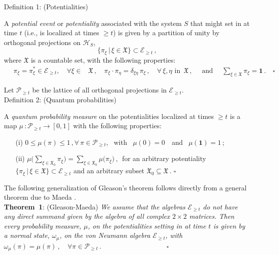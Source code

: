 \documentclass[12pt]{article}
\begin{document}
{Definition 1}: (Potentialities)

A \textit{potential event} or \textit{potentiality} associated with the system $S$ that might set in at time $t$ (i.e., is localized
at times $\geq t$) is given by a partition of unity by orthogonal projections on $\mathcal{H}_S$,
$$\big\{ \pi_{\xi}\, \vert \,\xi \in \mathfrak{X} \big\} \subset \mathcal{E}_{\geq t}\,,$$
where $\mathfrak{X}$ is a countable set, with the following properties:
\begin{align}\label{potentialty}
\quad \pi_{\xi}= \pi_{\xi}^{*} \in \mathcal{E}_{\geq t}, \quad \forall \xi \in &\mathfrak{X}\,,\quad
\pi_{\xi}\cdot\pi_{\eta} = \delta_{\xi \eta}\, \pi_{\xi} \,, \quad \forall\, \xi, \eta \text{ in }\, \mathfrak{X}\,, \quad
\text{ and } \quad \sum_{\xi \in \mathfrak{X}} \pi_{\xi} = \mathbf{1}\,.\quad \square
\end{align}

Let $\mathcal{P}_{\geq t}$ be the lattice of all orthogonal projections in $\mathcal{E}_{\geq t}$. \\

{Definition 2}: (Quantum probabilities)

A \textit{quantum probability measure} on the potentialities localized at times  $\geq t$ is a map
$\mu\,: \mathcal{P}_{\geq t} \rightarrow [0, 1]$ with the following properties:
\begin{enumerate}
\item[(i)]{ $0 \leq \mu(\pi) \leq 1\,, \forall\, \pi \in \mathcal{P}_{\geq t},$ \,\,with \,\,\,$\mu(0)=0\,$ \, and \, $\mu(\mathbf{1})=1\,$;}
\item[(ii)]{ $\mu\big(\sum_{\xi \in \mathfrak{X}_0} \pi_{\xi}\big) =
\sum_{\xi \in \mathfrak{X}_0} \mu\big(\pi_{\xi}\big)\,,$
\,for an arbitrary potentiality $\big\{ \pi_{\xi}\, \vert\, \xi \in \mathfrak{X} \big\} \subset \mathcal{E}_{\geq t}$ and
an arbitrary subset $\mathfrak{X}_0 \subseteq \mathfrak{X}$\,.
\hspace{11cm}$\square$}
\end{enumerate}

The following generalization of {Gleason}'s theorem \cite{Gleason} follows directly from a general theorem due to
{Maeda} \cite{Maeda}.\\

{\bf{Theorem~1}}: (Gleason-Maeda) \textit{We assume that the algebras $\mathcal{E}_{\geq t}$ do not have any direct
summand given by the algebra of all complex $2\times 2$ matrices. Then every probability measure, $\mu$, on the
potentialities setting in at time $t$ is given by a normal state, $\omega_{\mu}$, on the von Neumann algebra
$\mathcal{E}_{\geq t}$, with \\
\vspace{0.1cm}\hspace{5.9cm}
$ \omega_{\mu}(\pi) = \mu(\pi)\,,\quad  \forall \pi \in \mathcal{P}_{\geq t}\,. \hspace{4cm} \square$
}\\
\end{document}
